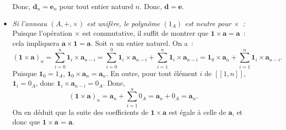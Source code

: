 \begin{itemize}[nosep]
        Donc, $\mathbf{d}_n = \mathbf{e}_n$ pour tout entier naturel $n$.
        Donc, $\mathbf{d} = \mathbf{e}$.
    \item \textit{Si l'anneau $(A, +, \times)$ est unifère, le polynôme $(1_A)$ est neutre pour $\times$ :}
        Puisque l'opération $\times$ est commutative, il suffit de montrer que $\mathbf{1} \times \mathbf{a} = \mathbf{a}$ : cela impliquera $\mathbf{a} \times \mathbf{1} = \mathbf{a}$.
        Soit $n$ un entier naturel. 
        On a : 
        \begin{equation*}
            (\mathbf{1} \times \mathbf{a})_n 
            = \sum_{i=0}^n \mathbf{1}_i \times \mathbf{a}_{n-i}
            = \sum_{i=0}^0 \mathbf{1}_i \times \mathbf{a}_{n-i} + \sum_{i=1}^n \mathbf{1}_i \times \mathbf{a}_{n-i}
            = \mathbf{1}_0 \times \mathbf{a}_n + \sum_{i=1}^n \mathbf{1}_i \times \mathbf{a}_{n-i}.
        \end{equation*}
        Puisque $\mathbf{1}_0 = 1_A$, $\mathbf{1}_0 \times \mathbf{a}_n = \mathbf{a}_n$.
        En outre, pour tout élément $i$ de $[\![1, n]\!]$, $\mathbf{1}_i = 0_A$, donc $\mathbf{1}_i \times \mathbf{a}_{n-i} = 0_A$.
        Donc, 
        \begin{equation*}
            (\mathbf{1} \times \mathbf{a})_n 
            = \mathbf{a}_n + \sum_{i=1}^n 0_A
            = \mathbf{a}_n + 0_A
            = \mathbf{a}_n .
        \end{equation*}
        On en déduit que la suite des coefficients de $\mathbf{1} \times \mathbf{a}$ est égale à celle de $\mathbf{a}$, et donc que $\mathbf{1} \times \mathbf{a}$ = $\mathbf{a}$.
\end{itemize}

\done

